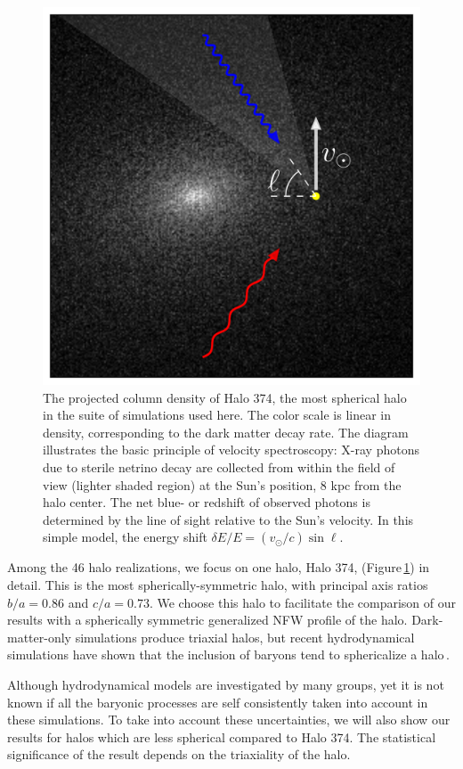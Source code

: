 \documentclass[aps,prd,10pt,twocolumn,superscriptaddress,showpacs]{revtex4-1}
\begin{document}
\begin{figure}[h!]
\centering
\includegraphics[width=0.9\columnwidth]{vspec_diagram.png}
\caption{The projected column density of Halo 374, the most spherical halo in the suite of
	simulations used here. The color scale is linear in density,
corresponding to the dark matter decay rate. The diagram illustrates the basic principle of velocity
spectroscopy: X-ray photons due to sterile netrino decay are collected from within the field
of view (lighter shaded region) at the Sun's position, 8 kpc from the halo center. The net blue- or redshift of observed photons 
is determined by the line of sight relative to the Sun's velocity. In this simple model, the energy
shift $\delta E/E=(v_\odot/c)\sin\ell$.}
\label{fig:halo374}
\end{figure}


Among the 46 halo realizations, we focus on one halo, Halo 374, (Figure\,\ref{fig:halo374}) in detail. This is the most spherically-symmetric halo, with principal axis ratios $b/a=0.86$ and $c/a=0.73$.  We choose this halo to facilitate the comparison of our results with a spherically symmetric generalized NFW profile of the halo.  Dark-matter-only simulations produce triaxial halos, but recent hydrodynamical simulations have shown that the inclusion of baryons tend to sphericalize a halo\,\cite{Debattista:2007yz,Bryan:2012mw,Bernal:2014mmt,Bernal:2016guq}.

Although hydrodynamical models are investigated by many groups, yet it is not known if all the baryonic processes are self consistently taken into account in these simulations.  To take into account these uncertainties, we will also show our results for halos which are less spherical compared to Halo 374.  The statistical significance of the result depends on the triaxiality of the halo.
\end{document}
